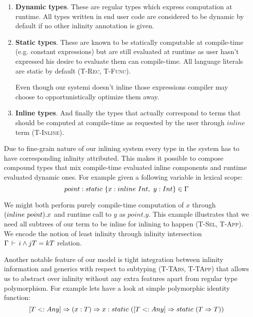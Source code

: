 \begin{enumerate}
  \item \textbf{Dynamic types}. These are regular types which express computation at runtime.
        All types written in end user code are considered to be dynamic by default if
        no other inlinity annotation is given.

  \item \textbf{Static types}. These are known to be statically computable at compile-time 
        (e.g. constant expressions) but are still evaluated at runtime as user hasn't
        expressed his desire to evaluate them can compile-time. All language literals
        are  static by default (\textsc{T-Rec}, \textsc{T-Func}).

        Even though our systemi doesn't inline those expressions compiler may 
        choose to opportunistically optimize them away. 

  \item \textbf{Inline types}. And finally the types that actually correspond to terms that
        should be computed at compile-time as requested by the user through $inline$ term
        (\textsc{T-Inline}). 
\end{enumerate}

Due to fine-grain nature of our inlining system every type in the system has to 
have corresponding inlinity attributed. This makes it possible to compose compound
types that mix compile-time evaluated inline components and runtime evaluated dynamic
ones. For example given a following variable in lexical scope:  
\begin{equation}\nonumber
    point: static\ \{ x: inline\ Int,\ y: Int \} \in \Gamma
\end{equation}

We might both perform purely compile-time computation of $x$ through $(inline\ point).x$ 
and runtime call to $y$ as $point.y$. This example illustrates that we need all subtrees
of our term to be inline for inlining to happen (\textsc{T-Sel}, \textsc{T-App}). We encode
the notion of least inlinity through inlinity intersection $\Gamma \,\vdash\, i \wedge j T = k T$
relation.

Another notable feature of our model is tight integration between inlinity information and
generics with respect to subtyping (\textsc{T-TAbs}, \textsc{T-TApp}) that allows us to
abstract over inlinity without any extra features apart from regular type polymorphism.
For example lets have a look at simple polymorphic identity function:
\begin{equation}\nonumber
    [T <: Any] \Rightarrow (x: T) \Rightarrow x: static\ ([T <: Any] \Rightarrow static\ (T \Rightarrow T))
\end{equation}

